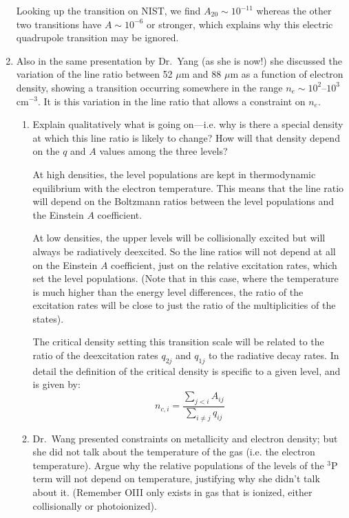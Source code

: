 \documentclass[11pt, preprint]{article}
\begin{document}
\begin{enumerate}
\begin{answer}
    Looking up the transition on NIST, we find $A_{20} \sim 10^{-11}$
    whereas the other two transitions have $A \sim 10^{-6}$ or
    stronger, which explains why this electric quadrupole transition
    may be ignored.
  \end{answer}
\item Also in the same presentation by Dr.~Yang (as she is now!) she
  discussed the variation of the line ratio between 52 $\mu$m and 88
  $\mu$m as a function of electron density, showing a transition
  occurring somewhere in the range $n_e\sim10^2$--$10^3$ cm$^{-3}$. It
  is this variation in the line ratio that allows a constraint on $n_e$.
\begin{enumerate}
  \item Explain qualitatively what is going on---i.e. why is there a
    special density at which this line ratio is likely to change? How
    will that density depend on the $q$ and $A$ values among the three
    levels?

    \begin{answer}
      At high densities, the level populations are kept in
      thermodynamic equilibrium with the electron temperature. This
      means that the line ratio will depend on the Boltzmann ratios
      between the level populations and the Einstein $A$ coefficient.

      At low densities, the upper levels will be collisionally excited
      but will always be radiatively deexcited. So the line ratios
      will not depend at all on the Einstein $A$ coefficient, just on
      the relative excitation rates, which set the level
      populations. (Note that in this case, where the temperature is
      much higher than the energy level differences, the ratio of the
      excitation rates will be close to just the ratio of the
      multiplicities of the states).

      The critical density setting this transition scale will be
      related to the ratio of the deexcitation rates $q_{2j}$ and
      $q_{1j}$ to the radiative decay rates. In detail the definition
      of the critical density is specific to a given level, and is
      given by:
      \begin{equation}
        n_{c,i} = \frac{\sum_{j<i} A_{ij}}{\sum_{i\ne j} q_{ij}}
      \end{equation}
    \end{answer}
  \item Dr.~Wang presented constraints on metallicity and electron
    density; but she did not talk about the temperature of the gas
    (i.e. the electron temperature).  Argue why the relative
    populations of the levels of the ${}^3$P term will not depend on
    temperature, justifying why she didn't talk about it.  (Remember
    OIII only exists in gas that is ionized, either collisionally or
    photoionized).


\end{enumerate}
\end{enumerate}
\end{document}
